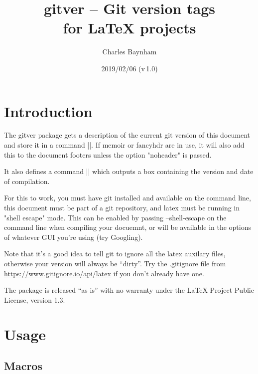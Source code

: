 \documentclass[a4paper]{ltxdoc}
\begin{document}
\title{\textsf{gitver} -- Git version tags \\ 
for \LaTeX{} projects}
\author{Charles Baynham}
\date{2019/02/06 (v\,1.0)}

\maketitle

\section{Introduction}

The \textsf{gitver} package gets a description of the current git version of this
document and store it in a command |\gitVer|. If memoir or fancyhdr are in use, it
will also add this to the document footers unless the option "noheader" is
passed.

It also defines a command |\versionBox| which outputs a box containing the
version and date of compilation. 

For this to work, you must have git installed and available on the command
line, this document must be part of a git repository, and latex must be
running in "shell escape" mode. This can be enabled by passing \textsf{--shell-escape}
on the command line when compiling your docuemnt, or will be available in the
options of whatever GUI you're using (try Googling).

Note that it's a good idea to tell git to ignore all the latex auxilary files,
otherwise your version will always be ``dirty''. Try the \textsf{.gitignore} file from
\url{https://www.gitignore.io/api/latex} if you don't already have
one.

The package is released ``as is'' with no warranty under the LaTeX Project Public
License, version 1.3.

\section{Usage}

\subsection{Macros} %
\label{sub:macros}
\end{document}
